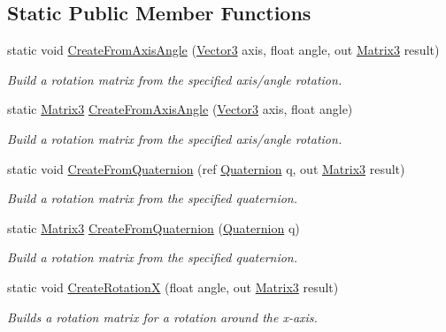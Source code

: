 \subsection*{Static Public Member Functions}
\begin{DoxyCompactItemize}
\item 
static void \hyperlink{struct_open_t_k_1_1_matrix3_a95845c92ca396ef97edb06881e6e8f64}{Create\-From\-Axis\-Angle} (\hyperlink{struct_open_t_k_1_1_vector3}{Vector3} axis, float angle, out \hyperlink{struct_open_t_k_1_1_matrix3}{Matrix3} result)
\begin{DoxyCompactList}\small\item\em Build a rotation matrix from the specified axis/angle rotation. \end{DoxyCompactList}\item 
static \hyperlink{struct_open_t_k_1_1_matrix3}{Matrix3} \hyperlink{struct_open_t_k_1_1_matrix3_ac93b6bcfe5a4293ff20bcd0111dd06f9}{Create\-From\-Axis\-Angle} (\hyperlink{struct_open_t_k_1_1_vector3}{Vector3} axis, float angle)
\begin{DoxyCompactList}\small\item\em Build a rotation matrix from the specified axis/angle rotation. \end{DoxyCompactList}\item 
static void \hyperlink{struct_open_t_k_1_1_matrix3_aab2702a067e4057ea92abf253803c3ca}{Create\-From\-Quaternion} (ref \hyperlink{struct_open_t_k_1_1_quaternion}{Quaternion} q, out \hyperlink{struct_open_t_k_1_1_matrix3}{Matrix3} result)
\begin{DoxyCompactList}\small\item\em Build a rotation matrix from the specified quaternion. \end{DoxyCompactList}\item 
static \hyperlink{struct_open_t_k_1_1_matrix3}{Matrix3} \hyperlink{struct_open_t_k_1_1_matrix3_a69aa1459186b8f5d716d91a80545f06e}{Create\-From\-Quaternion} (\hyperlink{struct_open_t_k_1_1_quaternion}{Quaternion} q)
\begin{DoxyCompactList}\small\item\em Build a rotation matrix from the specified quaternion. \end{DoxyCompactList}\item 
static void \hyperlink{struct_open_t_k_1_1_matrix3_adceec1f2f8101b386255392a162e0072}{Create\-Rotation\-X} (float angle, out \hyperlink{struct_open_t_k_1_1_matrix3}{Matrix3} result)
\begin{DoxyCompactList}\small\item\em Builds a rotation matrix for a rotation around the x-\/axis. \end{DoxyCompactList}\item 

\end{DoxyCompactItemize}
